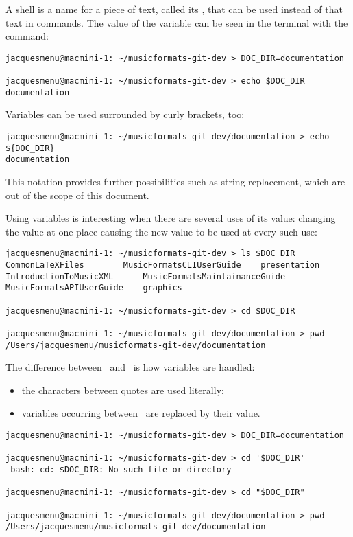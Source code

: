 A shell  is a name for a piece of text, called its , that can be used instead of that text in commands. The value of the variable can be seen in the terminal with the  command:
\begin{lstlisting}[language=Terminal]
jacquesmenu@macmini-1: ~/musicformats-git-dev > DOC_DIR=documentation

jacquesmenu@macmini-1: ~/musicformats-git-dev > echo $DOC_DIR
documentation
\end{lstlisting}

Variables can be used surrounded by curly brackets, too:
\begin{lstlisting}[language=Terminal]
jacquesmenu@macmini-1: ~/musicformats-git-dev/documentation > echo ${DOC_DIR}
documentation
\end{lstlisting}
This notation provides further possibilities such as string replacement, which are out of the scope of this document.

Using variables is interesting when there are several uses of its value: changing the value at one place causing the new value to be used at every such use:
\begin{lstlisting}[language=Terminal]
jacquesmenu@macmini-1: ~/musicformats-git-dev > ls $DOC_DIR
CommonLaTeXFiles		MusicFormatsCLIUserGuide	presentation
IntroductionToMusicXML		MusicFormatsMaintainanceGuide
MusicFormatsAPIUserGuide	graphics

jacquesmenu@macmini-1: ~/musicformats-git-dev > cd $DOC_DIR

jacquesmenu@macmini-1: ~/musicformats-git-dev/documentation > pwd
/Users/jacquesmenu/musicformats-git-dev/documentation
\end{lstlisting}

The difference between \quotes\ and \doubleQuotes\ is how variables are handled:
\begin{itemize}
\item the characters between quotes are used literally;
\item variables occurring between \doubleQuotes\ are replaced by their value.
\end{itemize}

\begin{lstlisting}[language=Terminal]
jacquesmenu@macmini-1: ~/musicformats-git-dev > DOC_DIR=documentation

jacquesmenu@macmini-1: ~/musicformats-git-dev > cd '$DOC_DIR'
-bash: cd: $DOC_DIR: No such file or directory

jacquesmenu@macmini-1: ~/musicformats-git-dev > cd "$DOC_DIR"

jacquesmenu@macmini-1: ~/musicformats-git-dev/documentation > pwd
/Users/jacquesmenu/musicformats-git-dev/documentation
\end{lstlisting}

